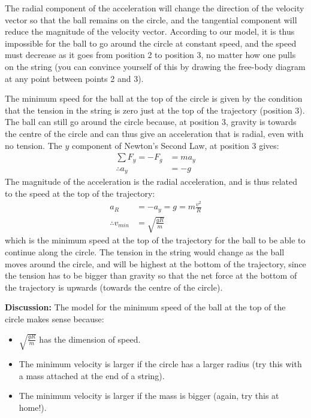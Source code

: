 \begin{example}
The radial component of the acceleration will change the direction of the velocity vector so that the ball remains on the circle, and the tangential component will reduce the magnitude of the velocity vector. According to our model, it is thus impossible for the ball to go around the circle at constant speed, and the speed must decrease as it goes from position 2 to position 3, no matter how one pulls on the string (you can convince yourself of this by drawing the free-body diagram at any point between points 2 and 3). 

The minimum speed for the ball at the top of the circle is given by the condition that the tension in the string is zero just at the top of the trajectory (position 3). The ball can still go around the circle because, at position 3, gravity is towards the centre of the circle and can thus give an acceleration that is radial, even with no tension. The $y$ component of Newton's Second Law, at position 3 gives:
\begin{align*}
\sum F_y = -F_g &= ma_y\\
\therefore a_y &=-g
\end{align*}
The magnitude of the acceleration is the radial acceleration, and is thus related to the speed at the top of the trajectory:
\begin{align*}
a_R&=-a_y=g = m\frac{v^2}{R}\\
\therefore v_{min}&=\sqrt{\frac{gR}{m}}
\end{align*}
which is the minimum speed at the top of the trajectory for the ball to be able to continue along the circle. The tension in the string would change as the ball moves around the circle, and will be highest at the bottom of the trajectory, since the tension has to be bigger than gravity so that the net force at the bottom of the trajectory is upwards (towards the centre of the circle).

\textbf{Discussion:} The model for the minimum speed of the ball at the top of the circle makes sense because:
\begin{itemize}
\item $\sqrt{\frac{gR}{m}}$ has the dimension of speed.
\item The minimum velocity is larger if the circle has a larger radius (try this with a mass attached at the end of a string). 
\item The minimum velocity is larger if the mass is bigger (again, try this at home!). 
\end{itemize}
\end{example}

